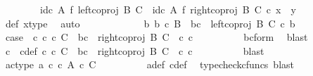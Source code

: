\begin{isabellebody}
\ \ \ \ \ \ \ \ {\isacharparenleft}{\kern0pt}id\isactrlsub c\ A\ {\isasymtimes}\isactrlsub f\ left{\isacharunderscore}{\kern0pt}coproj\ B\ C{\isacharparenright}{\kern0pt}\ {\isasymamalg}\ {\isacharparenleft}{\kern0pt}id\isactrlsub c\ A\ {\isasymtimes}\isactrlsub f\ right{\isacharunderscore}{\kern0pt}coproj\ B\ C{\isacharparenright}{\kern0pt}\ {\isasymcirc}\isactrlsub c\ x\ {\isacharequal}{\kern0pt}\ y{\isachardoublequoteclose}\isanewline
\ \ \ \ \ \ \ \ \isamarkupfalse%
\ {\isasymphi}{\isacharunderscore}{\kern0pt}def\ x{\isacharunderscore}{\kern0pt}type\ \isamarkupfalse%
\ auto\isanewline
\ \ \ \ \isamarkupfalse%
\isanewline
\ \ \ \ \ \ \isamarkupfalse%
\ {\isachardoublequoteopen}{\isasymnexists}b{\isachardot}{\kern0pt}\ b\ {\isasymin}\isactrlsub c\ B\ {\isasymand}\ bc\ {\isacharequal}{\kern0pt}\ left{\isacharunderscore}{\kern0pt}coproj\ B\ C\ {\isasymcirc}\isactrlsub c\ b{\isachardoublequoteclose}\isanewline
\ \ \ \ \ \ \isamarkupfalse%
\ \isamarkupfalse%
\ case{}{\isacharcolon}{\kern0pt}\ {\isachardoublequoteopen}{\isasymexists}\ c{\isachardot}{\kern0pt}\ c\ {\isasymin}\isactrlsub c\ C\ {\isasymand}\ bc\ {\isacharequal}{\kern0pt}\ {\isacharparenleft}{\kern0pt}right{\isacharunderscore}{\kern0pt}coproj\ B\ C\ \ {\isasymcirc}\isactrlsub c\ c{\isacharparenright}{\kern0pt}{\isachardoublequoteclose}\isanewline
\ \ \ \ \ \ \ \ \isamarkupfalse%
\ bc{\isacharunderscore}{\kern0pt}form\ \isamarkupfalse%
\ blast\isanewline
\ \ \ \ \ \ \isamarkupfalse%
\ \isamarkupfalse%
\ c\ \ c{\isacharunderscore}{\kern0pt}def{\isacharcolon}{\kern0pt}\ {\isachardoublequoteopen}c\ {\isasymin}\isactrlsub c\ C\ {\isasymand}\ bc\ {\isacharequal}{\kern0pt}\ right{\isacharunderscore}{\kern0pt}coproj\ B\ C\ \ {\isasymcirc}\isactrlsub c\ c{\isachardoublequoteclose}\isanewline
\ \ \ \ \ \ \ \ \isamarkupfalse%
\ blast\isanewline
\ \ \ \ \ \ \isamarkupfalse%
\ \isamarkupfalse%
\ ac{\isacharunderscore}{\kern0pt}type{\isacharcolon}{\kern0pt}\ {\isachardoublequoteopen}{\isasymlangle}a{\isacharcomma}{\kern0pt}\ c{\isasymrangle}\ {\isasymin}\isactrlsub c\ {\isacharparenleft}{\kern0pt}A\ {\isasymtimes}\isactrlsub c\ C{\isacharparenright}{\kern0pt}{\isachardoublequoteclose}\isanewline
\ \ \ \ \ \ \ \ \isamarkupfalse%
\ a{\isacharunderscore}{\kern0pt}def\ c{\isacharunderscore}{\kern0pt}def\ \isamarkupfalse%
\ {\isacharparenleft}{\kern0pt}typecheck{\isacharunderscore}{\kern0pt}cfuncs{\isacharcomma}{\kern0pt}\ blast{\isacharparenright}{\kern0pt}\isanewline

\end{isabellebody}
